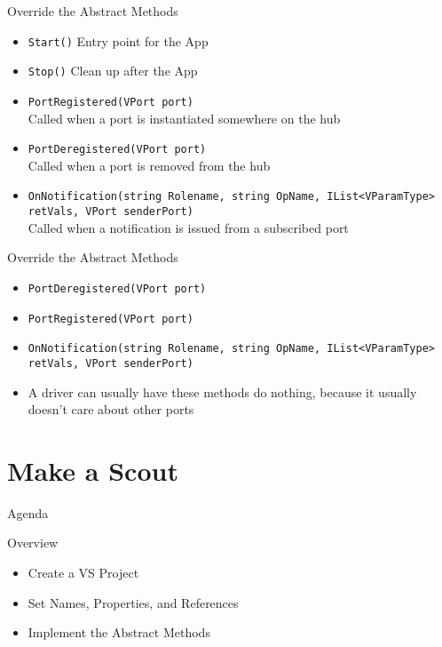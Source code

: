 \documentclass[11pt]{beamer}
\begin{document}
\begin{frame}{Override the Abstract Methods}
    \begin{itemize}
        \item \texttt{Start()} Entry point for the App
        \item \texttt{Stop()}  Clean up after the App
        \item \texttt{PortRegistered(VPort port)}\\ Called when a port is instantiated somewhere on the hub
        \item \texttt{PortDeregistered(VPort port)}\\ Called when a port is removed from the hub
        \item \texttt{OnNotification(string Rolename, string OpName, IList<VParamType> retVals, VPort senderPort)}\\ Called when a notification is issued from a subscribed port
    \end{itemize}
\end{frame}

\begin{frame}{Override the Abstract Methods}
    \begin{itemize}
        \item \texttt{PortDeregistered(VPort port)}
        \item \texttt{PortRegistered(VPort port)}
        \item \texttt{OnNotification(string Rolename, string OpName, IList<VParamType> retVals, VPort senderPort)}
        \item A driver can usually have these methods do nothing, because it usually doesn't care about other ports
    \end{itemize}
\end{frame}



\section{Make a Scout}

\begin{frame}{Agenda}
\tableofcontents
\end{frame}

\begin{frame}{Overview}
    \begin{itemize}
        \item Create a VS Project
        \item Set Names, Properties, and References
        \item Implement the Abstract Methods
    \end{itemize}
\end{frame}
\end{document}
